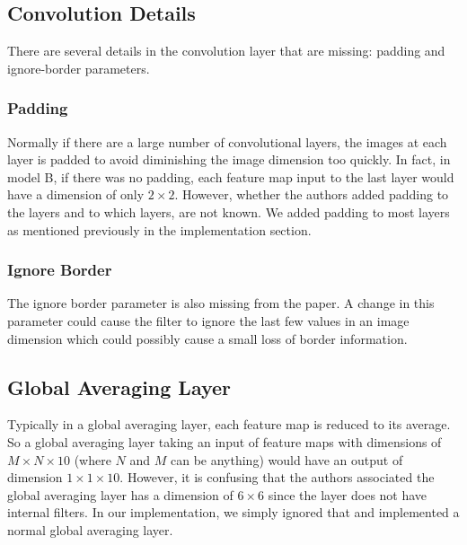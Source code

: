 \subsection{Convolution Details}
There are several details in the convolution layer that are missing: padding and ignore-border parameters.
\subsubsection{Padding}
Normally if there are a large number of convolutional layers, the images at each layer is padded to avoid diminishing the image dimension too quickly. In fact, in model B, if there was no padding, each feature map input to the last layer would have a dimension of only $2\times 2$. However, whether the authors added padding to the layers and to which layers, are not known. We added padding to most layers as mentioned previously in the implementation section.

\subsubsection{Ignore Border}
The ignore border parameter is also missing from the paper. A change in this parameter could cause the filter to ignore the last few values in an image dimension which could possibly cause a small loss of border information.

\subsection{Global Averaging Layer}
Typically in a global averaging layer, each feature map is reduced to its average. So a global averaging layer taking an input of feature maps with dimensions of $M\times N \times 10$ (where $N$ and $M$ can be anything) would have an output of dimension $1\times 1\times 10$. However, it is confusing that the authors associated the global averaging layer has a dimension of $6\times6$ since the layer does not have internal filters. In our implementation, we simply ignored that and implemented a normal global averaging layer.

